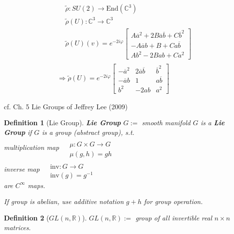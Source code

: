 \documentclass[10pt]{amsart}
\newtheorem{definition}{Definition}
\begin{document}
\begin{multicols*}{2}
\[
\begin{gathered}
\begin{aligned}
& \widetilde{\rho} : SU(2) \to \text{End}(\mathbb{C}^3) \\
& \widetilde{\rho}(U) : \mathbb{C}^3 \to \mathbb{C}^3 \\
& \widetilde{\rho}(U)(v) = e^{-2i\varphi} \left[ \begin{matrix} A\overline{a}^2 + 2B\overline{a}\overline{b} + C \overline{b}^2 \\ 
-A\overline{a}b + B + Ca\overline{b} \\
Ab^2 - 2Bab + Ca^2 \end{matrix} \right]
\end{aligned} \\
\Longrightarrow \widetilde{\rho}(U) = e^{-2i \varphi} \left[ \begin{matrix} -\overline{a}^2 & 2\overline{a}\overline{b} & \overline{b}^2 \\
-\overline{a}b & 1 & a\overline{b} \\
b^2 & - 2ab & a^2 \end{matrix} \right]
\end{gathered}
\]

cf. Ch. 5 Lie Groups of Jeffrey Lee (2009) \cite{JLee2009}

\begin{definition}[Lie Group]
\textbf{Lie Group} $G :=$ smooth manifold $G$ is a \textbf{Lie Group} if $G$ is a group (abstract group), s.t. \\
multiplication map $\begin{aligned} & \quad \\ 
& \mu : G \times G \to G \\
& \mu(g,h) = gh \end{aligned}$ \\
inverse map $\begin{aligned} & \quad \\ 
& \text{inv} : G \to G \\
& \text{inv}(g) = g^{-1} \end{aligned}$ \\
are $C^{\infty}$ maps.

If group is abelian, use additive notation $g+h$ for group operation.
\end{definition}

\begin{definition}[$GL(n, \mathbb{R})$]
	$GL(n,\mathbb{R}) := $ group of all invertible real $n\times n$ matrices. 
	

\end{definition}
\end{multicols*}
\end{document}
